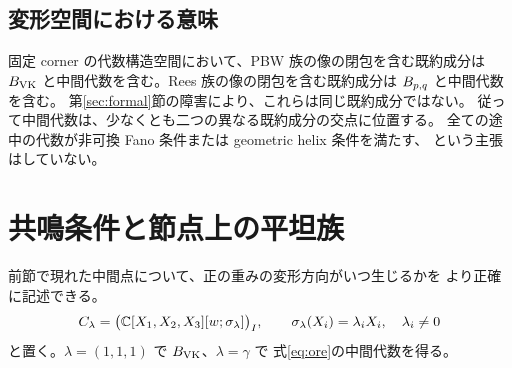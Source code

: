 \subsection{変形空間における意味}
固定 corner の代数構造空間において、PBW 族の像の閉包を含む既約成分は
$B_{\mathrm{VK}}$ と中間代数を含む。Rees 族の像の閉包を含む既約成分は
$B_{p,q}$ と中間代数を含む。
第\ref{sec:formal}節の障害により、これらは同じ既約成分ではない。
従って中間代数は、少なくとも二つの異なる既約成分の交点に位置する。
全ての途中の代数が非可換 Fano 条件または geometric helix 条件を満たす、
という主張はしていない。

\section{共鳴条件と節点上の平坦族}\label{sec:resonance}
前節で現れた中間点について、正の重みの変形方向がいつ生じるかを
より正確に記述できる。
\[
 C_\lambda=
 \bigl(\mathbb C[X_1,X_2,X_3][w;\sigma_\lambda]\bigr)_I,
 \qquad\sigma_\lambda(X_i)=\lambda_iX_i,
 \quad\lambda_i\ne0
\]
と置く。$\lambda=(1,1,1)$ で $B_{\mathrm{VK}}$、$\lambda=\gamma$ で
式\eqref{eq:ore}の中間代数を得る。

